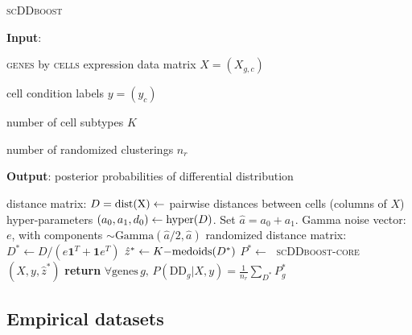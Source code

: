 \documentclass[aoas,preprint]{imsart}
\begin{document}
\begin{algorithm}
\caption{\textsc{scDDboost}}\label{alg:scDDboost}
\raggedright\hspace*{\algorithmicindent} \textbf{Input}: \begin{list}{}{}
 \item  \textsc{genes} by \textsc{cells} expression data matrix $X=(X_{g,c})$
 \item  cell condition labels $y=(y_c)$
 \item  number of cell subtypes $K$
 \item number of randomized clusterings $n_r$
 \end{list}
\hspace*{\algorithmicindent} \textbf{Output}: posterior probabilities of differential distribution
\begin{algorithmic}[2]
\State distance matrix: $D=\rm{dist}(X) \gets$ pairwise distances between cells (columns of $X$)
\State hyper-parameters $(a_0, a_1, d_0) \gets {\mbox {\rm hyper}}(D)$. Set $\hat a = a_0 + a_1$.
\Repeat
\State Gamma noise vector: $e$, with components $\sim \text{Gamma}(\hat a/2,\hat a)$
\State randomized distance matrix: $D^* \gets D / (e\textbf{1}^T +  \textbf{1}e^T)$
\State $\hat z^* \gets {\mbox {\rm $K-$medoids}}(D^*)$
\State $P^* \gets\;$ \textsc{scDDboost-core}$(X,y,\hat z^*)$
\State \textbf{return} $\forall \text{genes} \, g, \, P(\text{DD}_g|X,y) = \frac{1}{n_r}
   \sum_{D^*} P^*_g$
\EndProcedure
\end{algorithmic}
\end{algorithm}
\FloatBarrier


\subsection*{Empirical datasets}
\end{document}
